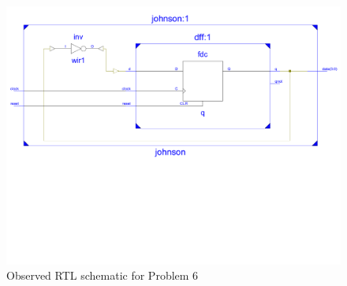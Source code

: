 \documentclass{lab_sheet}
\begin{document}
    \begin{figure}[H]
        \centering
        \includegraphics[scale=0.48]{../Figures/q6_ckt.pdf}
        \caption{Observed RTL schematic for Problem 6}
        \label{fig:rtl6}
    \end{figure}
\end{document}
